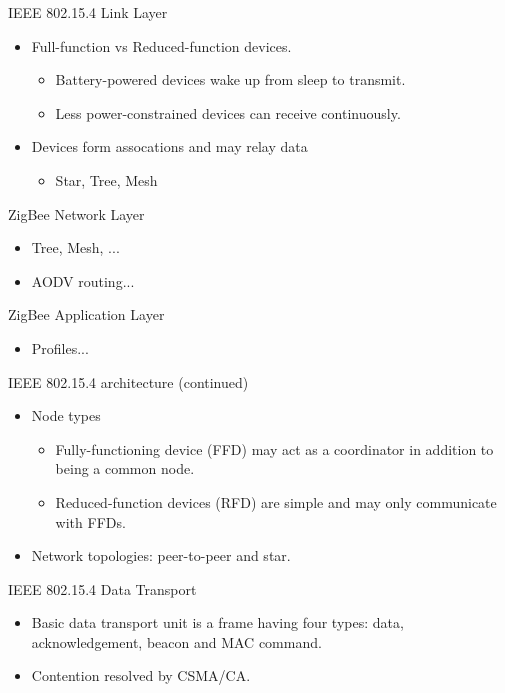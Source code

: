 \documentclass{beamer}
\begin{document}
\begin{frame}{IEEE 802.15.4 Link Layer}
  \begin{itemize}
    \item Full-function vs Reduced-function devices.
	\begin{itemize}
  		\item Battery-powered devices wake up from sleep to transmit.
  		\item Less power-constrained devices can receive continuously.
	\end{itemize}
	
  	\item Devices form assocations and may relay data
  	\begin{itemize}
  		\item Star, Tree, Mesh
  	\end{itemize}
  \end{itemize}
\end{frame}

\begin{frame}{ZigBee Network Layer}
  \begin{itemize}
  	\item Tree, Mesh, ...
  	\item AODV routing...
  \end{itemize}
\end{frame}

\begin{frame}{ZigBee Application Layer}
  \begin{itemize}
  	\item Profiles...
  \end{itemize}
\end{frame}

\begin{frame}{IEEE 802.15.4 architecture (continued)}
  \begin{itemize}
    \item Node types  
      \begin{itemize}
      \item Fully-functioning device (FFD) may act as a coordinator in addition
      to being a common node. 
      \item Reduced-function devices (RFD) are simple and may only communicate
      with FFDs.
    \end{itemize}
    \item Network topologies: peer-to-peer and star.
  \end{itemize}
\end{frame}

\begin{frame}{IEEE 802.15.4 Data Transport}
  \begin{itemize}
    \item Basic data transport unit is a frame having four types: data, 
    acknowledgement, beacon and MAC command.
    \item Contention resolved by CSMA/CA.
  \end{itemize}
\end{frame}
\end{document}

